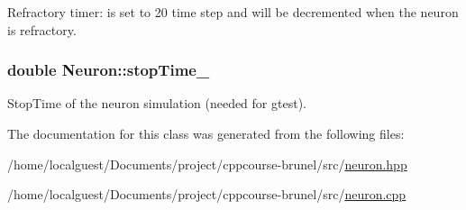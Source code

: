 Refractory timer\-: is set to 20 time step and will be decremented when the neuron is refractory. 

\hypertarget{classNeuron_aa38f38c0da520dc1cb5d374c70e974eb}{
\subsubsection[{stop\-Time\-\_\-}]{\setlength{\rightskip}{0pt plus 5cm}double Neuron\-::stop\-Time\-\_\-\hspace{0.3cm}{\ttfamily [private]}}}\label{classNeuron_aa38f38c0da520dc1cb5d374c70e974eb}


Stop\-Time of the neuron simulation (needed for gtest). 



The documentation for this class was generated from the following files\-:\begin{DoxyCompactItemize}
\item 
/home/localguest/\-Documents/project/cppcourse-\/brunel/src/\hyperlink{neuron_8hpp}{neuron.\-hpp}\item 
/home/localguest/\-Documents/project/cppcourse-\/brunel/src/\hyperlink{neuron_8cpp}{neuron.\-cpp}\end{DoxyCompactItemize}
